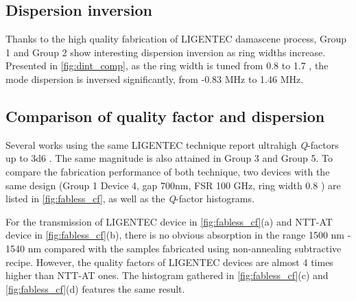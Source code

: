\subsection{Dispersion inversion}

Thanks to the high quality fabrication of LIGENTEC damascene process, Group 1 and Group 2 show interesting dispersion inversion as ring widths increase. Presented in \autoref{fig:dint_comp}, as the ring width is tuned from 0.8 \um to 1.7 \um, the mode dispersion is inversed significantly, from -0.83 MHz to 1.46 MHz.

\begin{figure}
	\centering
	
	\label{fig:dint_comp}
\end{figure}


\subsection{Comparison of quality factor and dispersion}


Several works using the same LIGENTEC technique report ultrahigh \textit{Q}-factors up to \num{3d6} \cites{Yu2019, Vaidya2019}. The same magnitude is also attained in Group 3 and Group 5. To compare the fabrication performance of both technique, two devices with the same design (Group 1 Device 4, gap 700nm, FSR 100 GHz, ring width 0.8 \um ) are listed in \autoref{fig:fabless_cf}, as well as the \textit{Q}-factor histograms.

\begin{figure}
	\centering
	
	\label{fig:fabless_cf}
\end{figure}

For the transmission of LIGENTEC device in \autoref{fig:fabless_cf}(a)  and NTT-AT device in \autoref{fig:fabless_cf}(b), there is no obvious absorption in the range 1500 nm - 1540 nm compared with the samples fabricated using non-annealing subtractive recipe.
However, the quality factors of LIGENTEC devices are almost 4 times higher than NTT-AT ones.
The histogram gathered in \autoref{fig:fabless_cf}(c) and \autoref{fig:fabless_cf}(d) features the same result.

